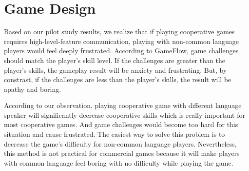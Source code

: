 \section{Game Design}


Based on our pilot study results, we realize that if playing cooperative games requires high-level-feature communication, playing with non-common language players would feel deeply frustrated. According to GameFlow\cite{GD1}, game challenges should match the player's skill level. If the challenges are greater than the player's skills, the gameplay result will be anxiety and frustrating. But, by constrast, if the challenges are less than the player's skills, the result will be apathy and boring.


According to our observation, playing cooperative game with different language speaker will significantly decrease cooperative skills which is really important for most cooperative games. And game challenges would become too hard for this situation and cause frustrated. The easiest way to solve this problem is to decrease the game's difficulty for non-common language players. Nevertheless, this method is not practical for commercial games because it will make players with common language feel boring with no difficulty while playing the game.  


